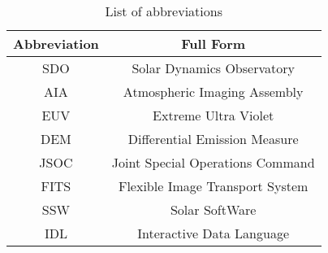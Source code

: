 
\setcounter{page}{1}
\begin{table*}[h!]
    \centering
    \setlength{\tabcolsep}{10pt}
    \renewcommand{\arraystretch}{1.5}
    \begin{tabular}{ | c | c | }
      \hline
      \textbf{Abbreviation} & \textbf{Full Form} \\
      \hline
      SDO & Solar Dynamics Observatory \\
      AIA & Atmospheric Imaging Assembly \\
      EUV & Extreme Ultra Violet \\
      DEM & Differential Emission Measure \\
      JSOC & Joint Special Operations Command \\
      FITS & Flexible Image Transport System \\
      SSW & Solar SoftWare \\
      IDL & Interactive Data Language \\
      \hline
    \end{tabular}
    \caption{List of abbreviations}
    \label{table:abbr}
\end{table*}

